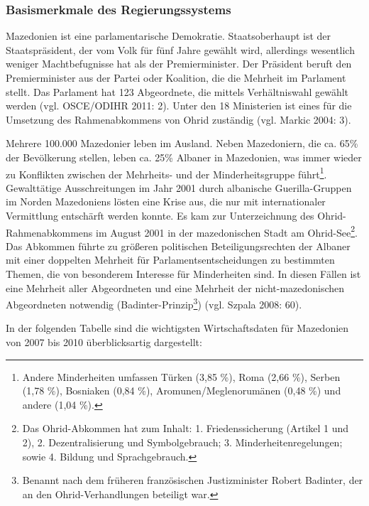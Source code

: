 \subsubsection{Basismerkmale des Regierungssystems}

Mazedonien ist eine parlamentarische Demokratie. Staatsoberhaupt ist der Staatspräsident, der vom Volk für fünf Jahre gewählt wird, allerdings wesentlich weniger Machtbefugnisse hat als der Premierminister. Der Präsident beruft den Premierminister aus der Partei oder Koalition, die die Mehrheit im Parlament stellt. Das Parlament hat 123 Abgeordnete, die mittels Verhältniswahl gewählt werden (vgl. OSCE/ODIHR 2011: 2). Unter den 18 Ministerien ist eines für die Umsetzung des Rahmenabkommens von Ohrid zuständig (vgl. Markic 2004: 3).\par
Mehrere 100.000 Mazedonier leben im Ausland. Neben Mazedoniern, die ca. 65\% der Bevölkerung stellen, leben ca. 25\% Albaner in Mazedonien, was immer wieder zu Konflikten zwischen der Mehrheits- und der Minderheitsgruppe führt\footnote{Andere Minderheiten umfassen Türken (3,85 \%), Roma (2,66 \%), Serben (1,78 \%), Bosniaken (0,84 \%), Aromunen/Meglenorumänen (0,48 \%) und andere (1,04 \%).}. Gewalttätige Ausschreitungen im Jahr 2001 durch albanische Guerilla-Gruppen im Norden Mazedoniens lösten eine Krise aus, die nur mit internationaler Vermittlung entschärft werden konnte. Es kam zur Unterzeichnung des Ohrid-Rahmenabkommens im August 2001 in der mazedonischen Stadt am Ohrid-See\footnote{Das Ohrid-Abkommen hat zum Inhalt: 1. Friedenssicherung (Artikel 1 und 2), 2. Dezentralisierung und Symbolgebrauch; 3. Minderheitenregelungen; sowie 4. Bildung und Sprachgebrauch.}. Das Abkommen führte zu größeren politischen Beteiligungsrechten der Albaner mit einer doppelten Mehrheit für Parlamentsentscheidungen zu bestimmten Themen, die von besonderem Interesse für Minderheiten sind. In diesen Fällen ist eine Mehrheit aller Abgeordneten und eine Mehrheit der nicht-mazedonischen Abgeordneten notwendig (Badinter-Prinzip\footnote{Benannt nach dem früheren französischen Justizminister Robert Badinter, der an den Ohrid-Verhandlungen beteiligt war.}) (vgl. Szpala 2008: 60).\par
In der folgenden Tabelle sind die wichtigsten Wirtschaftsdaten für Mazedonien von 2007 bis 2010 überblicksartig dargestellt:
